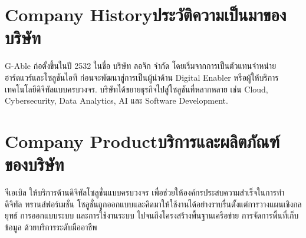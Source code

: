 \section{\ifenglish Company History\else ประวัติความเป็นมาของบริษัท\fi}

G-Able \cite{gableWebsite} ก่อตั้งขึ้นในปี 2532 ในชื่อ บริษัท ลอจิก จำกัด โดยเริ่มจากการเป็นตัวแทนจำหน่ายฮาร์ดแวร์และโซลูชันไอที ก่อนจะพัฒนาสู่การเป็นผู้นำด้าน Digital Enabler หรือผู้ให้บริการเทคโนโลยีดิจิทัลแบบครบวงจร. บริษัทได้ขยายธุรกิจไปสู่โซลูชันที่หลากหลาย เช่น Cloud, Cybersecurity, Data Analytics, AI และ Software Development. 

\section{\ifenglish Company Product\else บริการและผลิตภัณฑ์ของบริษัท\fi}
จีเอเบิล ให้บริการด้านดิจิทัลโซลูชั่นแบบครบวงจร \cite{solution} เพื่อช่วยให้องค์กรประสบความสำเร็จในการทำ ดิจิทัล ทรานส์ฟอร์เมชั่น
โซลูชั่นถูกออกแบบและคิดมาให้ใช้งานได้อย่างราบรื่นตั้งแต่การวางแผนเชิงกลยุทธ์ การออกแบบระบบ และการใช้งานระบบ ไปจนถึงโครงสร้างพื้นฐานเครือข่าย การจัดการพื้นที่เก็บข้อมูล ด้วยบริการระดับมืออาชีพ

